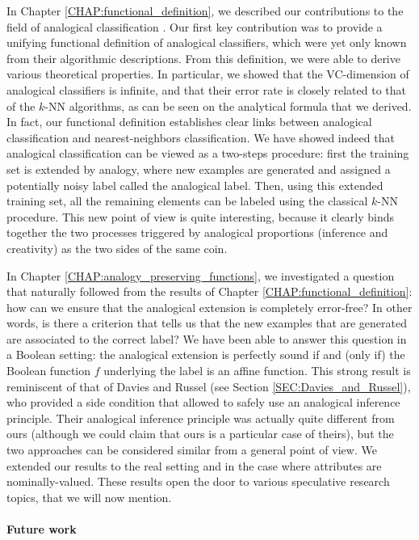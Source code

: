 In Chapter \ref{CHAP:functional_definition}, we described our contributions to
the field of analogical classification \cite{HugPraRicSerECAI16}. Our first key
contribution was to provide a unifying functional definition of analogical
classifiers, which were yet only known from their algorithmic descriptions.
From this definition, we were able to derive various theoretical properties. In
particular, we showed that the VC-dimension of analogical classifiers is
infinite, and that their error rate is closely related to that of the $k$-NN
algorithms, as can be seen on the analytical formula that we derived. In fact,
our functional definition establishes clear links between analogical
classification and nearest-neighbors classification. We have showed indeed that
analogical classification can be viewed as a two-steps procedure: first the
training set is extended by analogy, where new examples are generated and
assigned a potentially noisy label called the analogical label. Then, using
this extended training set, all the remaining elements can be labeled using the
classical $k$-NN procedure. This new point of view is quite interesting,
because it clearly binds together the two processes triggered by analogical
proportions (inference and creativity) as the two sides of the same coin.

In Chapter \ref{CHAP:analogy_preserving_functions}, we investigated a question
that naturally followed from the results of Chapter
\ref{CHAP:functional_definition}: how can we ensure that the analogical
extension is completely error-free? In other words, is there a criterion that
tells us that the new examples that are generated are associated to the correct
label? We have been able to answer this question in a Boolean setting: the
analogical extension is perfectly sound if and (only if) the Boolean function
$f$ underlying the label is an affine function. This strong result
\cite{CouHugPraRicIJCAI17} is reminiscent of that of Davies and Russel (see
Section \ref{SEC:Davies_and_Russel}), who provided a side condition that
allowed to safely use an analogical inference principle. Their analogical
inference principle was actually quite different from ours (although we could claim
that ours is a particular case of theirs), but the two approaches can be
considered similar from a general point of view. We extended our results to the
real setting and in the case where attributes are nominally-valued. These
results open the door to various speculative research topics, that we will now
mention.

\paragraph{Future work\\}


